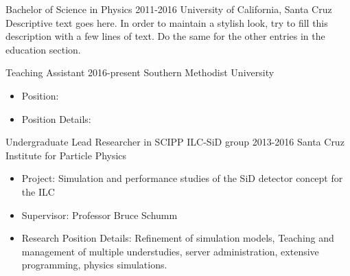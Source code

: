 


\sepspace




\EducationEntry
    {Bachelor of Science in Physics}
    {2011-2016}
    {University of California, Santa Cruz}
    {Descriptive text goes here. In order to maintain a stylish look, try to fill this description with a few lines of text. Do the same for the other entries in the education section.}
\sepspace



\WorkEntry
    {Teaching Assistant}
    {2016-present}
    {Southern Methodist University}
    {\begin{itemize}
        \item Position:
        \item Position Details:
    \end{itemize}}
\sepspace

\WorkEntry
    {Undergraduate Lead Researcher in SCIPP ILC-SiD group}
    {2013-2016}
    {Santa Cruz Institute for Particle Physics}
    {\begin{itemize}
        \item[] Project:
            Simulation and performance studies of the SiD detector concept for the ILC
        \item[] Supervisor:
            Professor Bruce Schumm
        \item[] Research Position Details:
            Refinement of simulation models, Teaching and management 
            of multiple understudies, server administration,
            extensive programming, physics simulations.
    \end{itemize}}
\sepspace

